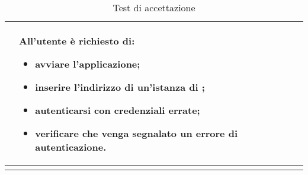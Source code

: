 \begin{longtabu}{| X[0.5] | X | X |}
		& All'utente è richiesto di:
		\begin{itemize}
			\item avviare l'applicazione;
			\item inserire l'indirizzo di un'istanza di \projectname{};
			\item autenticarsi con credenziali errate;
			\item verificare che venga segnalato un errore di autenticazione.
		\end{itemize}
\\ \hline

\caption{Test di accettazione}

\end{longtabu}
